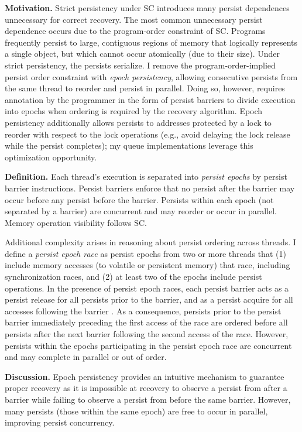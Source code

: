 \textbf{Motivation.}
Strict persistency under SC introduces many persist dependences unnecessary for correct recovery.
The most common unnecessary persist dependence occurs due to the program-order constraint of SC.
Programs frequently persist to large, contiguous regions of memory that logically represents a single object, but which cannot occur atomically (due to their size).
Under strict persistency, the persists serialize.
I remove the program-order-implied persist order constraint with \emph{epoch persistency}, allowing consecutive persists from the same thread to reorder and persist in parallel.
Doing so, however, requires annotation by the programmer in the form of persist barriers to divide execution into epochs when ordering is required by the recovery algorithm.
Epoch persistency additionally allows persists to addresses protected by a lock to reorder with respect to the lock operations (e.g., avoid delaying the lock release while the persist completes); my queue implementations leverage this optimization opportunity.

\textbf{Definition.}
Each thread's execution is separated into \emph{persist epochs} by persist barrier instructions.
Persist barriers enforce that no persist after the barrier may occur before any persist before the barrier.
Persists within each epoch (not separated by a barrier) are concurrent and may reorder or occur in parallel.
Memory operation visibility follows SC.

Additional complexity arises in reasoning about persist ordering across threads. 
I define a \emph{persist epoch race} as persist epochs from two or more threads that (1) include memory accesses (to volatile or persistent memory) that race, including synchronization races, and (2) at least two of the epochs include persist operations. 
In the presence of persist epoch races, each persist barrier acts as a persist release for all persists prior to the barrier, and as a persist acquire for all accesses following the barrier \cite{Gharachorloo90}.
As a consequence, persists prior to the persist barrier immediately preceding the first access of the race are ordered before all persists after the next barrier following the second access of the race.
However, persists within the epochs participating in the persist epoch race are concurrent and may complete in parallel or out of order.

\textbf{Discussion.}
Epoch persistency provides an intuitive mechanism to guarantee proper recovery as it is impossible at recovery to observe a persist from after a barrier while failing to observe a persist from before the same barrier.
However, many persists (those within the same epoch) are free to occur in parallel, improving persist concurrency.

